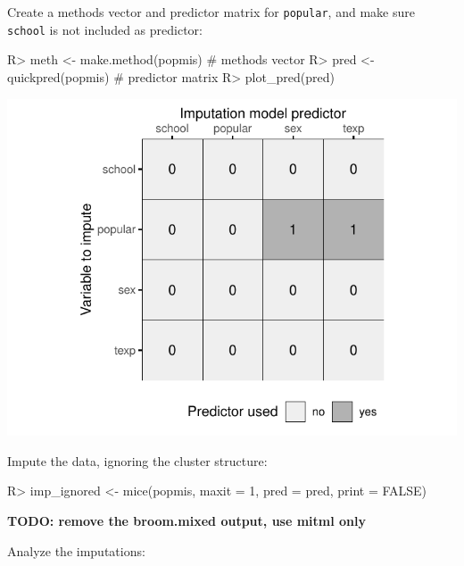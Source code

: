 \documentclass[
]{jss}
\begin{document}
Create a methods vector and predictor matrix for \texttt{popular}, and
make sure \texttt{school} is not included as predictor:

\begin{CodeChunk}
\begin{CodeInput}
R> meth <- make.method(popmis) # methods vector
R> pred <- quickpred(popmis)   # predictor matrix
R> plot_pred(pred)
\end{CodeInput}


\begin{center}\includegraphics{Imputation_of_Incomplete_Multilevel_Data_files/figure-latex/pop-ignored-pred-1} \end{center}

\end{CodeChunk}

Impute the data, ignoring the cluster structure:

\begin{CodeChunk}
\begin{CodeInput}
R> imp_ignored <- mice(popmis, maxit = 1, pred = pred, print = FALSE)
\end{CodeInput}
\end{CodeChunk}

\textbf{TODO: remove the broom.mixed output, use mitml only}

Analyze the imputations:
\end{document}
